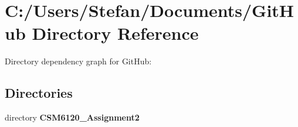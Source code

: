 \section{C\+:/\+Users/\+Stefan/\+Documents/\+Git\+Hub Directory Reference}
\label{dir_137b073837595efb536a7354aa7b9f36}
Directory dependency graph for Git\+Hub\+:
\subsection*{Directories}
\begin{DoxyCompactItemize}
\item 
directory {\bf C\+S\+M6120\+\_\+\+Assignment2}
\end{DoxyCompactItemize}
